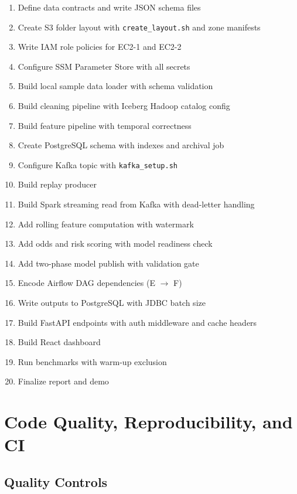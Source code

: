 \documentclass[11pt,a4paper]{article}
\begin{document}
\begin{enumerate}[nosep]
  \item Define data contracts and write JSON schema files
  \item Create S3 folder layout with \texttt{create\_layout.sh} and zone manifests
  \item Write IAM role policies for EC2-1 and EC2-2
  \item Configure SSM Parameter Store with all secrets
  \item Build local sample data loader with schema validation
  \item Build cleaning pipeline with Iceberg Hadoop catalog config
  \item Build feature pipeline with temporal correctness
  \item Create PostgreSQL schema with indexes and archival job
  \item Configure Kafka topic with \texttt{kafka\_setup.sh}
  \item Build replay producer
  \item Build Spark streaming read from Kafka with dead-letter handling
  \item Add rolling feature computation with watermark
  \item Add odds and risk scoring with model readiness check
  \item Add two-phase model publish with validation gate
  \item Encode Airflow DAG dependencies (E $\to$ F)
  \item Write outputs to PostgreSQL with JDBC batch size
  \item Build FastAPI endpoints with auth middleware and cache headers
  \item Build React dashboard
  \item Run benchmarks with warm-up exclusion
  \item Finalize report and demo
\end{enumerate}

\section{Code Quality, Reproducibility, and CI}

\subsection{Quality Controls}
\end{document}
